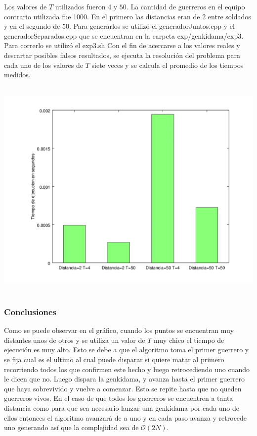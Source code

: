 			Los valores de $T$ utilizados fueron $4$ y $50$.
			La cantidad de guerreros en el equipo contrario utilizada fue 1000.
			En el primero las distancias eran de 2 entre soldados y en el segundo de $50$.
			Para generarlos se utilizó el generadorJuntos.cpp y el generadorSeparados.cpp  que se encuentran en la carpeta exp/genkidama/exp3.
			Para correrlo se utilizó el exp3.sh 
			Con el fin de acercarse a los valores reales y descartar posibles falsos resultados, se ejecuta la resolución del problema para cada uno de los valores de $T$ siete veces y se calcula el promedio de los tiempos medidos.\;


      	\includegraphics[height=11cm]{graficos/genkidama-exp3.png}


    	\subsubsection*{Conclusiones}\;

			Como se puede observar en el gráfico, cuando los puntos se encuentran muy distantes unos de otros y se utiliza un valor de $T$ muy chico el tiempo de ejecución es muy alto. 
			Esto se debe a que el algoritmo toma el primer guerrero y se fija cual es el ultimo al cual puede disparar si quiere matar al primero recorriendo todos los que confirmen este hecho y luego retrocediendo uno cuando le dicen que no. Luego dispara la genkidama, y avanza hasta el primer guerrero que haya sobrevivido y vuelve a comenzar. Esto se repite hasta que no queden guerreros vivos. En el caso de que todos los guerreros se encuentren a tanta distancia como para que sea necesario lanzar una genkidama por cada uno de ellos entonces el algoritmo avanzará de a uno y en cada paso avanza y retrocede uno generando así que la complejidad sea de $\mathcal{O}(2N)$. 
